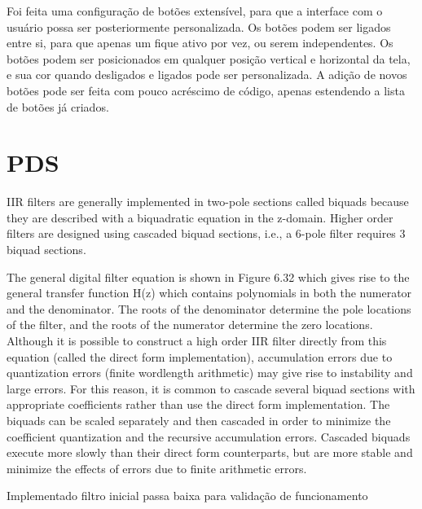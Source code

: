 \color{orange}
Foi feita uma configuração de botões extensível, para que a interface com o usuário possa ser posteriormente personalizada. Os botões podem ser ligados entre si, para que apenas um fique ativo por vez, ou serem independentes. Os botões podem ser posicionados em qualquer posição vertical e horizontal da tela, e sua cor quando desligados e ligados pode ser personalizada.
A adição de novos botões pode ser feita com pouco acréscimo de código, apenas estendendo a lista de botões já criados.
\color{black}

\section{PDS}

\color{red}
IIR filters are generally implemented in two-pole sections called biquads because
they are described with a biquadratic equation in the z-domain. Higher order filters
are designed using cascaded biquad sections, i.e., a 6-pole filter requires 3 biquad
sections.

The general digital filter equation is shown in Figure 6.32 which gives rise to the
general transfer function H(z) which contains polynomials in both the numerator
and the denominator. The roots of the denominator determine the pole locations of
the filter, and the roots of the numerator determine the zero locations. Although it
is possible to construct a high order IIR filter directly from this equation (called the
direct form implementation), accumulation errors due to quantization errors (finite
wordlength arithmetic) may give rise to instability and large errors. For this reason,
it is common to cascade several biquad sections with appropriate coefficients rather
than use the direct form implementation. The biquads can be scaled separately and
then cascaded in order to minimize the coefficient quantization and the recursive
accumulation errors. Cascaded biquads execute more slowly than their direct form
counterparts, but are more stable and minimize the effects of errors due to finite
arithmetic errors.

\color{orange}

Implementado filtro inicial passa baixa para validação de funcionamento

\color{black}

